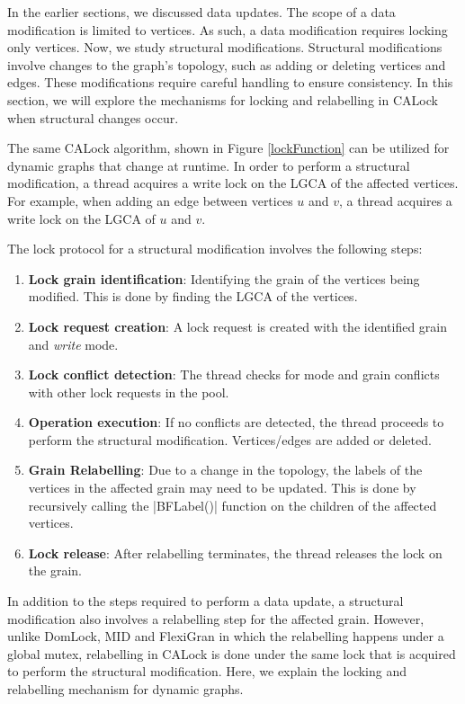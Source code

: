 In the earlier sections, we discussed data updates. The scope of a data modification is limited to vertices. As such, a data modification requires locking only vertices. Now, we study structural modifications. Structural modifications involve changes to the graph's topology, such as adding or deleting vertices and edges. These modifications require careful handling to ensure consistency. In this section, we will explore the mechanisms for locking and relabelling in CALock when structural changes occur.

The same CALock algorithm, shown in Figure \ref{lockFunction} can be utilized for dynamic graphs that change at runtime. 
In order to perform a structural modification, a thread acquires a write lock on the LGCA of the affected vertices. For example, when adding an edge between vertices $u$ and $v$, a thread acquires a write lock on the LGCA of $u$ and $v$. 

The lock protocol for a structural modification involves the following steps:

\begin{enumerate}
	\item \textbf{Lock grain identification}: Identifying the grain of the vertices being modified. This is done by finding the LGCA of the vertices.
	\item \textbf{Lock request creation}: A lock request is created with the identified grain and \emph{write} mode.
	\item \textbf{Lock conflict detection}: The thread checks for mode and grain conflicts with other lock requests in the pool.
	\item \textbf{Operation execution}:	If no conflicts are detected, the thread proceeds to perform the structural modification. Vertices/edges are added or deleted.
	\item \textbf{Grain Relabelling}: Due to a change in the topology, the labels of the vertices in the affected grain may need to be updated. This is done by recursively calling the \inline|BFLabel()| function on the children of the affected vertices.
	\item \textbf{Lock release}: After relabelling terminates, the thread releases the lock on the grain.
\end{enumerate}

In addition to the steps required to perform a data update, a structural modification also involves a relabelling step for the affected grain. However, unlike DomLock, MID and FlexiGran in which the relabelling happens under a global mutex, relabelling in CALock is done under the same lock that is acquired to perform the structural modification. 
Here, we explain the locking and relabelling mechanism for dynamic graphs.

